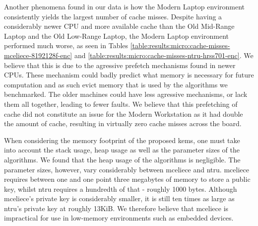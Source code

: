 Another phenomena found in our data is how the Modern Laptop environment consistently yields the largest number of cache misses. Despite having a considerably newer CPU and more available cache than the Old Mid-Range Laptop and the Old Low-Range Laptop, the Modern Laptop environment performed much worse, as seen in Tables \ref{table:results:micro:cache-misses-mceliece-8192128f-enc} and \ref{table:results:micro:cache-misses-ntru-hrss701-enc}. We believe that this is due to the agressive prefetch mechanisms found in newer CPUs. These mechanism could badly predict what memory is necessary for future computation and as such evict memory that is used by the algorithms we benchmarked. The older machines could have less agressive mechanisms, or lack them all together, leading to fewer faults. We believe that this prefetching of cache did not constitute an issue for the Modern Workstation as it had double the amount of cache, resulting in virtually zero cache misses across the board.

When considering the memory footprint of the proposed \glspl{kem}, one must take into account the stack usage, heap usage as well as the parameter sizes of the algorithms. We found that the heap usage of the algorithms is negligible. The parameter sizes, however, vary considerably between \gls{mceliece} and \gls{ntru}. \gls{mceliece} requires between one and one point three megabytes of memory to store a public key, whilst \gls{ntru} requires a hundredth of that - roughly 1000 bytes. Although \gls{mceliece}'s private key is considerably smaller, it is still ten times as large as \gls{ntru}'s private key at roughly 13KiB. We therefore believe that \gls{mceliece} is impractical for use in low-memory environments such as embedded devices.


